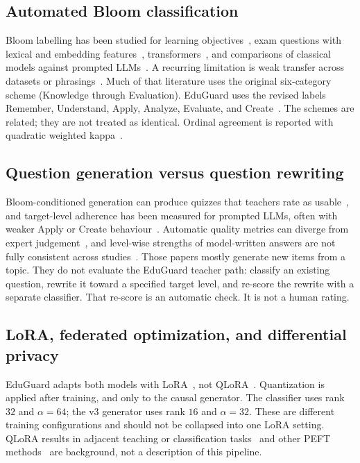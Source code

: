 \documentclass[journal]{IEEEtran}
\begin{document}
\subsection{Automated Bloom classification}
Bloom labelling has been studied for learning objectives~\cite{li2022objectives}, exam questions with lexical and embedding features~\cite{mohammed2020tfidf,abduljabbar2015bloom}, transformers~\cite{waheed2021bloomnet}, and comparisons of classical models against prompted LLMs~\cite{bloomanalysis2025,crossbloom2026}.
A recurring limitation is weak transfer across datasets or phrasings~\cite{waheed2021bloomnet,crossbloom2026}.
Much of that literature uses the original six-category scheme (Knowledge through Evaluation).
EduGuard uses the revised labels Remember, Understand, Apply, Analyze, Evaluate, and Create~\cite{anderson2001revision,bloom1956taxonomy}.
The schemes are related; they are not treated as identical.
Ordinal agreement is reported with quadratic weighted kappa~\cite{cohen1968weighted}.

\subsection{Question generation versus question rewriting}
Bloom-conditioned generation can produce quizzes that teachers rate as usable~\cite{teachers2024quizzes}, and target-level adherence has been measured for prompted LLMs, often with weaker Apply or Create behaviour~\cite{bea2024questions,qgen2024strategies}.
Automatic quality metrics can diverge from expert judgement~\cite{qgen2024strategies,slm2026teammates}, and level-wise strengths of model-written answers are not fully consistent across studies~\cite{gpt4answers2024}.
Those papers mostly generate new items from a topic.
They do not evaluate the EduGuard teacher path: classify an existing question, rewrite it toward a specified target level, and re-score the rewrite with a separate classifier.
That re-score is an automatic check.
It is not a human rating.

\subsection{LoRA, federated optimization, and differential privacy}
EduGuard adapts both models with LoRA~\cite{hu2022lora}, not QLoRA~\cite{dettmers2023qlora}.
Quantization is applied after training, and only to the causal generator.
The classifier uses rank $32$ and $\alpha{=}64$; the v3 generator uses rank $16$ and $\alpha{=}32$.
These are different training configurations and should not be collapsed into one LoRA setting.
QLoRA results in adjacent teaching or classification tasks~\cite{teachinglora,spamqlora2026} and other PEFT methods~\cite{sktuning2024} are background, not a description of this pipeline.
\end{document}
